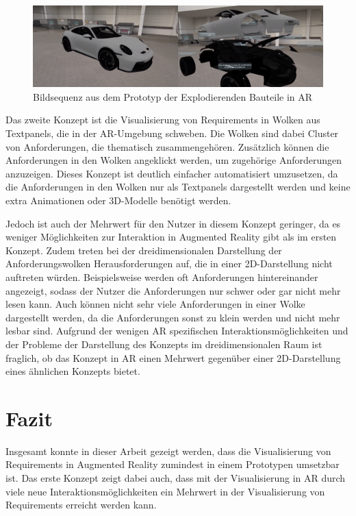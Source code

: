\begin{figure}[H]
    \centering
    \includegraphics[width=1\textwidth]{images/PorscheExplosionAR.png}
    \caption{Bildsequenz aus dem Prototyp der Explodierenden Bauteile in AR}
    \label{fig:porsche-explosion-ar}
\end{figure}

Das zweite Konzept ist die Visualisierung von Requirements in Wolken aus Textpanels, die in der AR-Umgebung schweben.
Die Wolken sind dabei Cluster von Anforderungen, die thematisch zusammengehören.
Zusätzlich können die Anforderungen in den Wolken angeklickt werden, um zugehörige Anforderungen anzuzeigen.
Dieses Konzept ist deutlich einfacher automatisiert umzusetzen, da die Anforderungen in den Wolken nur als Textpanels dargestellt werden und keine extra Animationen oder 3D-Modelle benötigt werden.

Jedoch ist auch der Mehrwert für den Nutzer in diesem Konzept geringer, da es weniger Möglichkeiten zur Interaktion in Augmented Reality gibt als im ersten Konzept.
Zudem treten bei der dreidimensionalen Darstellung der Anforderungswolken Herausforderungen auf, die in einer 2D-Darstellung nicht auftreten würden.
Beispielsweise werden oft Anforderungen hintereinander angezeigt, sodass der Nutzer die Anforderungen nur schwer oder gar nicht mehr lesen kann.
Auch können nicht sehr viele Anforderungen in einer Wolke dargestellt werden, da die Anforderungen sonst zu klein werden und nicht mehr lesbar sind.
Aufgrund der wenigen AR spezifischen Interaktionsmöglichkeiten und der Probleme der Darstellung des Konzepts im dreidimensionalen Raum ist fraglich, ob das Konzept in AR einen Mehrwert gegenüber einer 2D-Darstellung eines ähnlichen Konzepts bietet.



\section{Fazit}

Insgesamt konnte in dieser Arbeit gezeigt werden, dass die Visualisierung von Requirements in Augmented Reality zumindest in einem Prototypen umsetzbar ist.
Das erste Konzept zeigt dabei auch, dass mit der Visualisierung in AR durch viele neue Interaktionsmöglichkeiten ein Mehrwert in der Visualisierung von Requirements erreicht werden kann.


